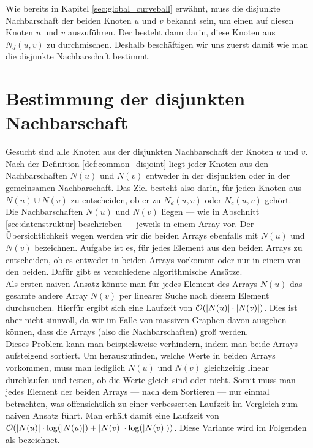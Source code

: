 Wie bereits in Kapitel \ref{sec:global_curveball} erwähnt, muss die disjunkte Nachbarschaft
der beiden Knoten $u$ und $v$ bekannt sein, um einen \ct{} auf diesen Knoten $u$ und $v$
auszuführen. Der \ct{} besteht dann darin, diese Knoten aus $N_{d}(u,v)$ zu durchmischen.
Deshalb beschäftigen wir uns zuerst damit wie man die disjunkte Nachbarschaft bestimmt.


\section{Bestimmung der disjunkten Nachbarschaft}
\label{sec:common}
Gesucht sind alle Knoten aus der disjunkten Nachbarschaft der Knoten $u$ und $v$.
Nach der Definition \ref{def:common_disjoint} liegt jeder Knoten aus den Nachbarschaften $N(u)$ und $N(v)$ 
entweder in der disjunkten oder in der gemeinsamen Nachbarschaft. Das Ziel besteht also darin, 
für jeden Knoten aus $N(u) \cup N(v)$ zu entscheiden, ob er zu $N_{d}(u,v)$ oder $N_{c}(u,v)$ gehört.
\\

Die Nachbarschaften $N(u)$ und $N(v)$ liegen --- wie in Abschnitt 
\ref{sec:datenstruktur} beschrieben --- jeweils
in einem Array vor. Der Übersichtlichkeit 
wegen werden wir die beiden
Arrays ebenfalls mit $N(u)$ und $N(v)$ bezeichnen. Aufgabe ist es,
 für jedes Element aus den beiden Arrays zu entscheiden,
ob es entweder in beiden Arrays vorkommt oder nur in einem von den beiden. Dafür 
gibt es verschiedene algorithmische Ansätze.
\\

Als ersten naiven Ansatz könnte man für jedes Element des Arrays $N(u)$ das gesamte andere 
Array $N(v)$ per linearer Suche nach diesem Element durchsuchen. Hierfür ergibt sich eine Laufzeit von
$\mathcal{O}(|N(u)|\cdot|N(v)|)$. Dies ist aber nicht sinnvoll, da wir 
im Falle von massiven Graphen davon ausgehen können, dass die Arrays (also die Nachbarschaften)
 groß werden. 
\\

Dieses Problem kann man beispielsweise verhindern, indem man beide Arrays aufsteigend sortiert. 
Um herauszufinden,
welche Werte in beiden Arrays vorkommen, muss man lediglich $N(u)$ und $N(v)$ gleichzeitig linear durchlaufen
und testen, ob die Werte gleich sind oder nicht. Somit muss man jedes 
Element der beiden Arrays --- nach dem Sortieren --- 
nur einmal betrachten, was offensichtlich zu einer verbesserten Laufzeit im Vergleich zum naiven
Ansatz führt. Man erhält damit eine Laufzeit von $\mathcal{O}(|N(u)|\cdot \log (|N(u)|)  + |N(v)|\cdot\log(|N(v)|))$. 
Diese Variante wird im Folgenden als \SorSor{} bezeichnet. 
\\

